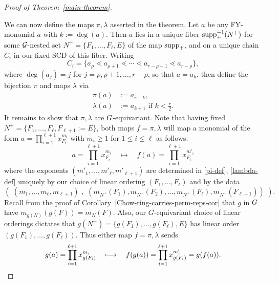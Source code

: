 \begin{proof}[Proof of Theorem~\ref{main-theorem}]
\begin{example}
\begin{center}
\end{center}
\end{example}

We can now define the maps $\pi, \lambda$ asserted in the theorem.
Let $a$ be any FY-monomial $a$ with $k:=\deg(a)$.  Then $a$ lies in a unique fiber 
$\mathrm{supp}_+^{-1}(N^+)$ for some $\mathcal{G}$-nested set 
$N^+=\{F_1,\ldots,F_\ell,E\}$
of the map $\mathrm{supp}_+$, and on a unique chain $C_i$
in our fixed SCD of this fiber.  Writing 
\begin{equation}
\label{typical-SCD-chain}
C_i=\{ a_{\rho} \lessdot a_{\rho+1} \lessdot \cdots \lessdot a_{r-\rho-1} \lessdot a_{r-\rho} \},
\end{equation}
where $\deg(a_j)=j$ for $j=\rho,\rho+1,\ldots,r-\rho$,
so that $a=a_k$, then define the bijection $\pi$ and maps $\lambda$ via
\begin{align}
\label{pi-def}
\pi(a)&:=a_{r-k},\\
\label{lambda-def}
\lambda(a)&:=a_{k+1} \text{ if }k < \frac{r}{2}.
\end{align}
It remains to show that $\pi,\lambda$ are $G$-equivariant. Note that having fixed $N^+=\{F_1,\ldots,F_\ell,F_{\ell+1}:=E\}$,
both maps $f=\pi, \lambda$ will
map a monomial of the form $a=\prod_{i=1}^{\ell+1} x_{F_i}^{m_i}$
with $m_i \geq 1$ for $1 \leq i \leq \ell$ as follows:
$$
a=\prod_{i=1}^{\ell+1} x_{F_i}^{m_i}
\quad
\longmapsto 
\quad
f(a)=\prod_{i=1}^{\ell+1} x_{F_i}^{m'_i}
$$
where the exponents $(m'_1,\ldots,m'_\ell,m'_{\ell+1})$
are determined in \eqref{pi-def}, \eqref{lambda-def} uniquely by
our choice of linear ordering $(F_1,\ldots,F_\ell)$ and
by the data 
$$
\left( 
\,\,
(m_1,\ldots,m_{\ell},m_{\ell+1}) 
\,\,
,
\,\,
(m_{N^+}(F_1),  m_{N^+}(F_2),
\ldots,
m_{N^+}(F_\ell),
m_{N^+}(F_{\ell+1}))
\,\,
\right).
$$
Recall from the proof of Corollary~\ref{Chow-ring-carries-perm-reps-cor} that $g$ in $G$
have $m_{g(N)}(g(F))=m_{N}(F)$.  Also, our $G$-equivariant choice of linear orderings dictates that $g(N^+)=\{g(F_1),\ldots,g(F_\ell),E\}$ has linear order $(g(F_1),\ldots,g(F_\ell))$.  Thus either map $f=\pi, \lambda$ sends
$$
g(a)=\prod_{i=1}^{\ell+1} x_{g(F_i)}^{m_i}
\quad
\longmapsto 
\quad
f(g(a))= \prod_{i=1}^{\ell+1} x_{g(F_i)}^{m'_i}
=g(f(a)). \qedhere
$$
\end{proof}

